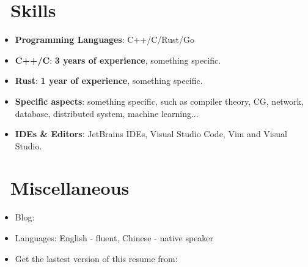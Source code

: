 \documentclass{resume}
\begin{document}
    \section{\faCogs\ Skills}
        \begin{itemize}
            \item \textbf{Programming Languages}: C++/C/Rust/Go

            \item \textbf{C++/C}:
            \textbf{3 years of experience}, something specific.

            \item \textbf{Rust}: \textbf{1 year of experience}, something specific.

            \item \textbf{Specific aspects}: something specific, such as compiler theory, CG, network, database, distributed system, machine learning...

            \item \textbf{IDEs \& Editors}: JetBrains IDEs, Visual Studio Code, Vim and Visual Studio.
        
        \end{itemize}

    \section{\faInfo\ Miscellaneous}
        \begin{itemize}
          \item Blog: 
          \item Languages: English - fluent, Chinese - native speaker
          \item Get the lastest version of this resume from: 
        \end{itemize}

\end{document}
